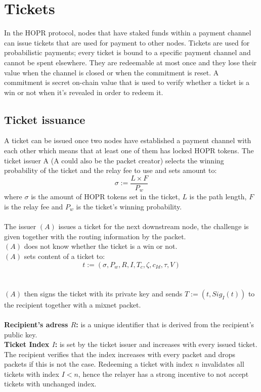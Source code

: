 \section{Tickets}
In the HOPR protocol, nodes that have staked funds within a payment channel can issue tickets that are used for payment to other nodes. 
Tickets are used for probabilistic payments; every ticket is bound to a specific payment channel and cannot be spent elsewhere. 
They are redeemable at most once and they lose their value when the channel is closed or when the commitment is reset. A commitment is secret on-chain value that is used to verify whether a ticket is a win or not when it's revealed in order to redeem it.
\subsection{Ticket issuance}
A ticket can be issued once two nodes have established a payment channel with each other which means that at least one of them has locked HOPR tokens.
\newline The ticket issuer A (A could also be the packet creator) selects the winning probability of the ticket and the relay fee to use and sets amount to:
$$\sigma:=\dfrac{L\times F}{P_w}$$
where $\sigma$ is the amount of HOPR tokens set in the ticket, $L$ is the path length, $F$ is the relay fee and $P_w$ is the ticket's winning probability.
\\~\\The issuer $(A)$ issues a ticket for the next downstream node, 
the challenge is given together with the routing information by the packet. 
\\$(A)$ does not know whether the ticket is a win or not.
\\$(A)$ sets content of a ticket to: $$t:=(\sigma,P_w,R,I,T_c,\zeta,c_{Id},\tau,V)$$ 
\\~\\$(A)$ then signs the ticket with its private key and sends $T:= (t, Sig_I(t))$ to the recipient together with a mixnet packet.
\\~\\\textbf{Recipient's adress $R$:} is a unique identifier that is derived from the recipient's public key.
\\\textbf{Ticket Index $I$:} is set by the ticket issuer and increases with every issued ticket. The recipient verifies that the index increases with every packet and drops packets if this is not the case. Redeeming a ticket with index $n$ invalidates all tickets with index $I<n$, hence the relayer has a strong incentive to not accept tickets with unchanged index.
